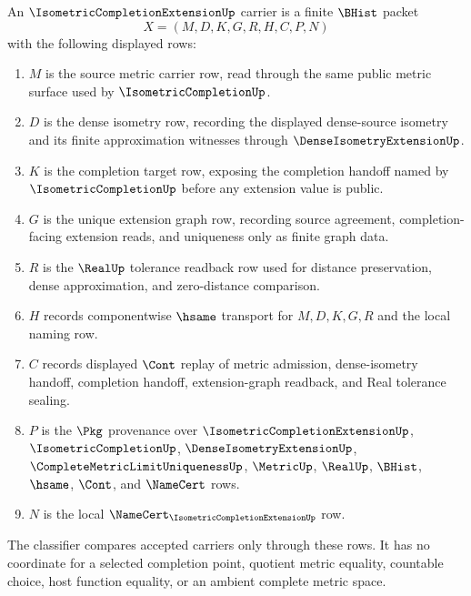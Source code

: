 \begin{definition}
\label{def:isometric-completion-extension-carrier}
An $\IsometricCompletionExtensionUp$ carrier is a finite $\BHist$ packet
$$
X=(M,D,K,G,R,H,C,P,N)
$$
with the following displayed rows:
\begin{enumerate}
\item $M$ is the source metric carrier row, read through the same public metric surface used by $\IsometricCompletionUp$.
\item $D$ is the dense isometry row, recording the displayed dense-source isometry and its finite approximation witnesses through $\DenseIsometryExtensionUp$.
\item $K$ is the completion target row, exposing the completion handoff named by $\IsometricCompletionUp$ before any extension value is public.
\item $G$ is the unique extension graph row, recording source agreement, completion-facing extension reads, and uniqueness only as finite graph data.
\item $R$ is the $\RealUp$ tolerance readback row used for distance preservation, dense approximation, and zero-distance comparison.
\item $H$ records componentwise $\hsame$ transport for $M,D,K,G,R$ and the local naming row.
\item $C$ records displayed $\Cont$ replay of metric admission, dense-isometry handoff, completion handoff, extension-graph readback, and Real tolerance sealing.
\item $P$ is the $\Pkg$ provenance over $\IsometricCompletionExtensionUp$, $\IsometricCompletionUp$, $\DenseIsometryExtensionUp$, $\CompleteMetricLimitUniquenessUp$, $\MetricUp$, $\RealUp$, $\BHist$, $\hsame$, $\Cont$, and $\NameCert$ rows.
\item $N$ is the local $\NameCert_{\IsometricCompletionExtensionUp}$ row.
\end{enumerate}
The classifier compares accepted carriers only through these rows. It has no coordinate for a selected completion point, quotient metric equality, countable choice, host function equality, or an ambient complete metric space.
\end{definition}

